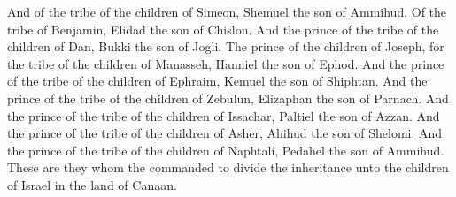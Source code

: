 \begin{biblechapter}
\verse And of the tribe of the children of Simeon, Shemuel the son of Ammihud.
\verse Of the tribe of Benjamin, Elidad the son of Chislon.
\verse And the prince of the tribe of the children of Dan, Bukki the son of Jogli.
\verse The prince of the children of Joseph, for the tribe of the children of Manasseh, Hanniel the son of Ephod.
\verse And the prince of the tribe of the children of Ephraim, Kemuel the son of Shiphtan.
\verse And the prince of the tribe of the children of Zebulun, Elizaphan the son of Parnach.
\verse And the prince of the tribe of the children of Issachar, Paltiel the son of Azzan.
\verse And the prince of the tribe of the children of Asher, Ahihud the son of Shelomi.
\verse And the prince of the tribe of the children of Naphtali, Pedahel the son of Ammihud.
\verse These are they whom the \LORD commanded to divide the inheritance unto the children of Israel in the land of Canaan.
\end{biblechapter}

